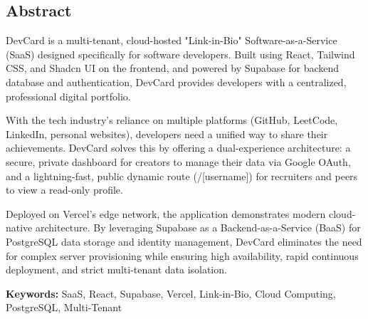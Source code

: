 \documentclass[12pt,a4paper]{report}     %
\begin{document}
\newpage
\pagestyle{plain}
\begin{center}
	\begin{LARGE}
		\section*{ Abstract}
	\end{LARGE}
\end{center}
\vspace{0.5cm}

{\normalsize
\setlength{\baselineskip}{1.1\baselineskip}

\noindent
DevCard is a multi-tenant, cloud-hosted "Link-in-Bio" Software-as-a-Service (SaaS) designed specifically for software developers. Built using React, Tailwind CSS, and Shadcn UI on the frontend, and powered by Supabase for backend database and authentication, DevCard provides developers with a centralized, professional digital portfolio. 

\vspace{0.3cm}

\noindent
With the tech industry's reliance on multiple platforms (GitHub, LeetCode, LinkedIn, personal websites), developers need a unified way to share their achievements. DevCard solves this by offering a dual-experience architecture: a secure, private dashboard for creators to manage their data via Google OAuth, and a lightning-fast, public dynamic route (/[username]) for recruiters and peers to view a read-only profile.

\vspace{0.3cm}

\noindent
Deployed on Vercel's edge network, the application demonstrates modern cloud-native architecture. By leveraging Supabase as a Backend-as-a-Service (BaaS) for PostgreSQL data storage and identity management, DevCard eliminates the need for complex server provisioning while ensuring high availability, rapid continuous deployment, and strict multi-tenant data isolation.

\vspace{0.6cm}

\noindent
\textbf{Keywords:} SaaS, React, Supabase, Vercel, Link-in-Bio, Cloud Computing, PostgreSQL, Multi-Tenant
}
\newpage
\end{document}
